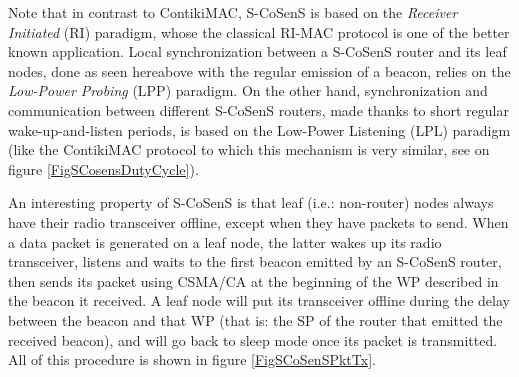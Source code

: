 \documentclass[conference]{IEEEtran}
\begin{document}
Note that in contrast to ContikiMAC, S-CoSenS is based on the \emph{Receiver
Initiated} (RI) paradigm, whose the classical RI-MAC protocol \cite{RIMAC}
is one of the better known application.
Local synchronization between a S-CoSenS router and its leaf nodes, done
as seen hereabove with the regular emission of a beacon, relies on the
\emph{Low-Power Probing} (LPP) paradigm.
On the other hand, synchronization and communication between different
S-CoSenS routers, made thanks to short regular wake-up-and-listen periods,
is based on the Low-Power Listening (LPL) paradigm (like the ContikiMAC
protocol to which this mechanism is very similar, see on figure
\ref{FigSCosensDutyCycle}).

An interesting property of S-CoSenS is that leaf (i.e.: non-router) nodes
always have their radio transceiver offline, except when they have packets
to send. When a data packet is generated on a leaf node, the latter wakes up
its radio transceiver, listens and waits to the first beacon emitted by
an S-CoSenS router, then sends its packet using CSMA/CA at the beginning
of the WP described in the beacon it received. A leaf node will put its
transceiver offline during the delay between the beacon and that WP
(that is: the SP of the router that emitted the received beacon), and
will go back to sleep mode once its packet is transmitted.
All of this procedure is shown in figure \ref{FigSCoSenSPktTx}.
\end{document}
